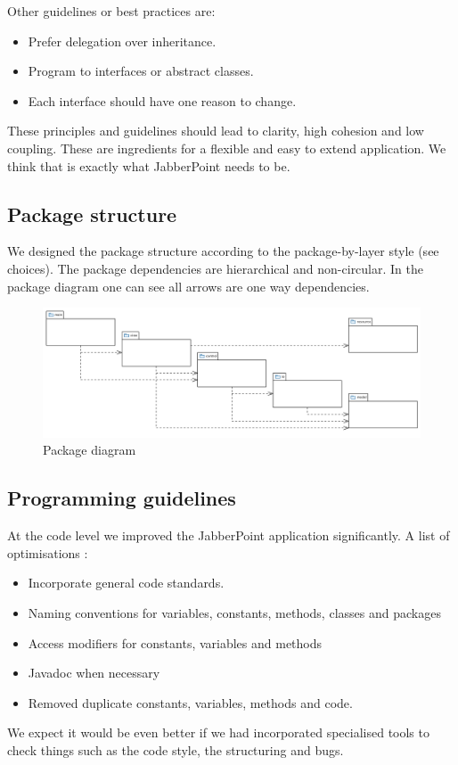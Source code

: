 \documentclass[a4paper]{article}
\begin{document}
Other guidelines or best practices are:
\begin{itemize}
\item Prefer delegation over inheritance.
\item Program to interfaces or abstract classes.
\item Each interface should have one reason to change.
\end{itemize}
These principles and guidelines should lead to clarity, high cohesion and low coupling. These are ingredients for a flexible and easy to extend application. We think that is exactly what JabberPoint needs to be. 

\subsection{Package structure}
We designed the package structure according to the package-by-layer style (see choices).
The package dependencies are hierarchical and non-circular. In the package diagram one can see all arrows are one way dependencies.

\begin{figure}[!htpb]
  \includegraphics[width=\linewidth]{JabberPointPackageDiagram.png}
  \caption{Package diagram}
  \label{fig:packdiag}
\end{figure}


\subsection{Programming guidelines}
At the code level we improved the JabberPoint application significantly.
A list of optimisations :
\begin{itemize} 
\item Incorporate general code standards.
\item Naming conventions for variables, constants, methods, classes and packages
\item Access modifiers for constants, variables and methods 
\item Javadoc when necessary
\item Removed duplicate constants, variables, methods and code.
\end{itemize} 
We expect it would be even better if we had incorporated specialised tools to check things such as the code style, the structuring and bugs. 
\end{document}

